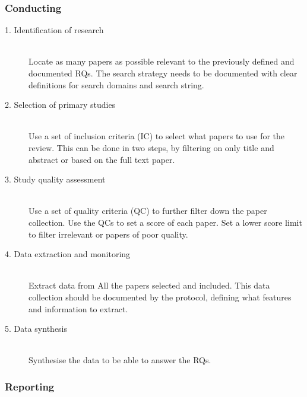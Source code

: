 
\subsubsection{Conducting}

\begin{description}

	\item[1. Identification of research] \hfill \\
		Locate as many papers as possible relevant to the previously defined and documented RQs. The search strategy needs to be documented with clear definitions for search domains and search string.

	\item[2. Selection of primary studies] \hfill \\
		Use a set of inclusion criteria (IC) to select what papers to use for the review. This can be done in two steps, by filtering on only title and abstract or based on the full text paper. 

	\item[3. Study quality assessment] \hfill \\
		Use a set of quality criteria (QC) to further filter down the paper collection. Use the QCs to set a score of each paper. Set a lower score limit to filter irrelevant or papers of poor quality.

	\item[4. Data extraction and monitoring] \hfill \\
		Extract data from All the papers selected and included. This data collection should be documented by the protocol, defining what features and information to extract.
	

	\item[5. Data synthesis] \hfill \\
		Synthesise the data to be able to answer the RQs. 
\end{description}


\subsubsection{Reporting}


